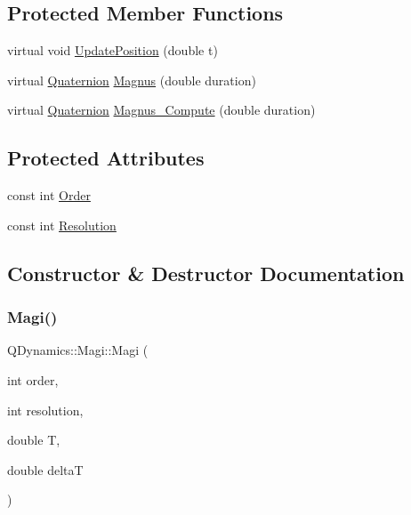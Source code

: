 \subsection*{Protected Member Functions}
\begin{DoxyCompactItemize}
\item 
virtual void \hyperlink{classQDynamics_1_1Magi_a500467f899244edfae15f34c84c7684c}{Update\+Position} (double t)
\item 
virtual \hyperlink{classQDynamics_1_1Quaternion}{Quaternion} \hyperlink{classQDynamics_1_1Magi_a04b85c8aa0e9549c750956c5f781433b}{Magnus} (double duration)
\item 
virtual \hyperlink{classQDynamics_1_1Quaternion}{Quaternion} \hyperlink{classQDynamics_1_1Magi_aadacdb3581a42babd5e1aa9ada6c77ee}{Magnus\+\_\+\+Compute} (double duration)
\end{DoxyCompactItemize}
\subsection*{Protected Attributes}
\begin{DoxyCompactItemize}
\item 
const int \hyperlink{classQDynamics_1_1Magi_ac9ff1c2f4ea0dcc30f1ee52b0894c9e9}{Order}
\item 
const int \hyperlink{classQDynamics_1_1Magi_a629449f541590040a7dfb98ca68cf97b}{Resolution}
\end{DoxyCompactItemize}


\subsection{Constructor \& Destructor Documentation}
\mbox{\label{classQDynamics_1_1Magi_a5b95b7c32c314e2800f59366964abfc3}} 
\subsubsection{\texorpdfstring{Magi()}{Magi()}\hspace{0.1cm}{\footnotesize\ttfamily [1/2]}}
{\footnotesize\ttfamily Q\+Dynamics\+::\+Magi\+::\+Magi (\begin{DoxyParamCaption}\item[{int}]{order,  }\item[{int}]{resolution,  }\item[{double}]{T,  }\item[{double}]{deltaT }\end{DoxyParamCaption})\hspace{0.3cm}{\ttfamily [inline]}}

